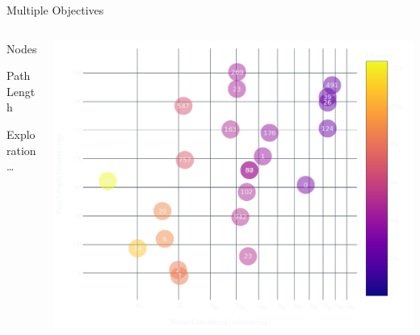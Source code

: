 \documentclass[aspectratio=169]{beamer}
\makeatletter
\renewcommand{\emph}[1]{{\Huge \color{pureminimalistic@text@red} #1}}
\makeatother
\begin{document}
\begin{frame}{{\color{pureminimalistic@text@white} Multiple Objectives}}
  \begin{columns}[T]
      \begin{column}{.4\linewidth}
          \begin{vfilleditems}
              \item \emph{Nodes}
              \vspace{1em}
              \item \emph{Path Length}
              \vspace{1em}
              \item \emph{Exploration}
              \vspace*{2em}
              {\centering \Huge \ldots }
          \end{vfilleditems}
      \end{column}
      \begin{column}{.6\linewidth}
      \includegraphics[width=0.9\linewidth, keepaspectratio]{figures/total_overview.pdf}
      \end{column}
  \end{columns}
\end{frame}
\end{document}
